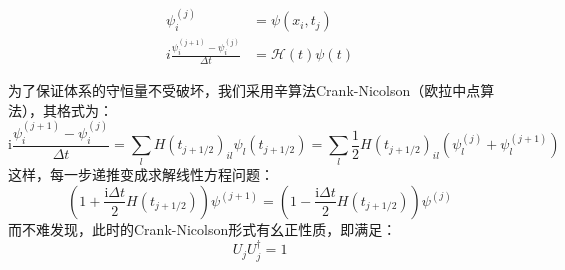 \documentclass[a4paper]{ctexart}
\begin{document}
\begin{equation}
\begin{aligned}
\psi_{i}^{(j)}&=\psi\left(x_{i}, t_{j}\right)\\
i\frac{\psi_{i}^{(j+1)}-\psi_{i}^{(j)}}{\Delta t}&=\mathcal{H}(t)\psi(t)
\end{aligned}
\end{equation}

为了保证体系的守恒量不受破坏，我们采用辛算法Crank-Nicolson（欧拉中点算法），其格式为：
\begin{equation}
\mathrm{i} \frac{\psi_{i}^{(j+1)}-\psi_{i}^{(j)}}{\Delta t}=\sum_{l} H\left(t_{j+1 / 2}\right)_{i l} \psi_{l}\left(t_{j+1 / 2}\right)=\sum_{l} \frac{1}{2} H\left(t_{j+1 / 2}\right)_{i l}\left(\psi_{l}^{(j)}+\psi_{l}^{(j+1)}\right)
\end{equation}
这样，每一步递推变成求解线性方程问题：
\begin{equation}
\left(1+\frac{\mathrm{i} \Delta t}{2} H\left(t_{j+1 / 2}\right)\right) \psi^{(j+1)}=\left(1-\frac{\mathrm{i} \Delta t}{2} H\left(t_{j+1 / 2}\right)\right) \psi^{(j)}
\end{equation}
而不难发现，此时的Crank-Nicolson形式有幺正性质，即满足：
\begin{equation}
U_jU^{\dagger}_j=1
\end{equation}
\end{document}
